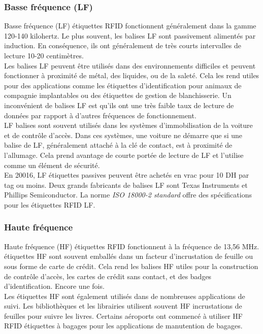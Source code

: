 \documentclass[11pt, a4paper, twoside]{book}
\begin{document}
\subsubsection{Basse fréquence (LF)}
Basse fréquence (LF) étiquettes RFID fonctionnent généralement dans la gamme 120-140 kilohertz. Le plus souvent, les balises LF sont passivement alimentés par induction. En conséquence, ils ont généralement de très courts intervalles de lecture 10-20 centimètres.\\

Les balises LF peuvent être utilisés dans des environnements difficiles et peuvent fonctionner à proximité de métal, des liquides, ou de la saleté. Cela les rend utiles pour des applications comme les étiquettes d'identification pour animaux de compagnie implantables ou des étiquettes de gestion de blanchisserie. Un inconvénient de balises LF est qu'ils ont une très faible taux de lecture de données par rapport à d'autres fréquences de fonctionnement.\\

LF balises sont souvent utilisés dans les systèmes d'immobilisation de la voiture et de contrôle d'accès. Dans ces systèmes, une voiture ne démarre que si une balise de LF, généralement attaché à la clé de contact, est à proximité de l'allumage. Cela prend avantage de courte portée de lecture de LF et l'utilise comme un élément de sécurité.\\

En 20016, LF étiquettes passives peuvent être achetés en vrac pour 10 DH par tag ou moins. Deux grands fabricants de balises LF sont Texas Instruments et Phillips Semiconductor. La norme \emph{ISO 18000-2 standard} offre des spécifications pour les étiquettes RFID LF.

\subsubsection{Haute fréquence}
Haute fréquence (HF) étiquettes RFID fonctionnent à la fréquence de 13,56 MHz. étiquettes HF sont souvent emballés dans un facteur d'incrustation de feuille ou sous forme de carte de crédit. Cela rend les balises HF utiles pour la construction de contrôle d'accès, les cartes de crédit sans contact, et des badges d'identification. Encore une fois.\\

Les étiquettes HF sont également utilisés dans de nombreuses applications de suivi. Les bibliothèques et les librairies utilisent souvent HF incrustations de feuilles pour suivre les livres. Certains aéroports ont commencé à utiliser HF RFID étiquettes à bagages pour les applications de manutention de bagages.\\
\end{document}
